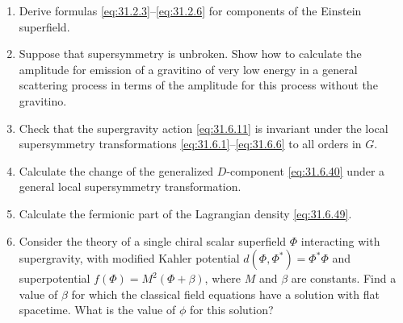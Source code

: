 

\begin{enumerate}
  \item Derive formulas \eqref{eq:31.2.3}--\eqref{eq:31.2.6} for
  components of the Einstein superfield.

  \item Suppose that supersymmetry is unbroken. Show how to calculate
  the amplitude for emission of a gravitino of very low energy in a
  general scattering process in terms of the amplitude for this process
  without the gravitino.

  \item Check that the supergravity action \eqref{eq:31.6.11} is
  invariant under the local supersymmetry transformations
  \eqref{eq:31.6.1}--\eqref{eq:31.6.6} to all orders in \(G\).

  \item Calculate the change of the generalized \(D\)-component
  \eqref{eq:31.6.40} under a general local supersymmetry transformation.

  \item Calculate the fermionic part of the Lagrangian density
  \eqref{eq:31.6.49}.

  \item Consider the theory of a single chiral scalar superfield
  \(\Phi\) interacting with supergravity, with modified Kahler
  potential \(d(\Phi,\Phi^*)=\Phi^*\Phi\) and superpotential
  \(f(\Phi)=M^2(\Phi+\beta)\), where \(M\) and \(\beta\) are constants.
  Find a value of \(\beta\) for which the classical field equations
  have a solution with flat spacetime. What is the value of \(\phi\)
  for this solution?
\end{enumerate}


